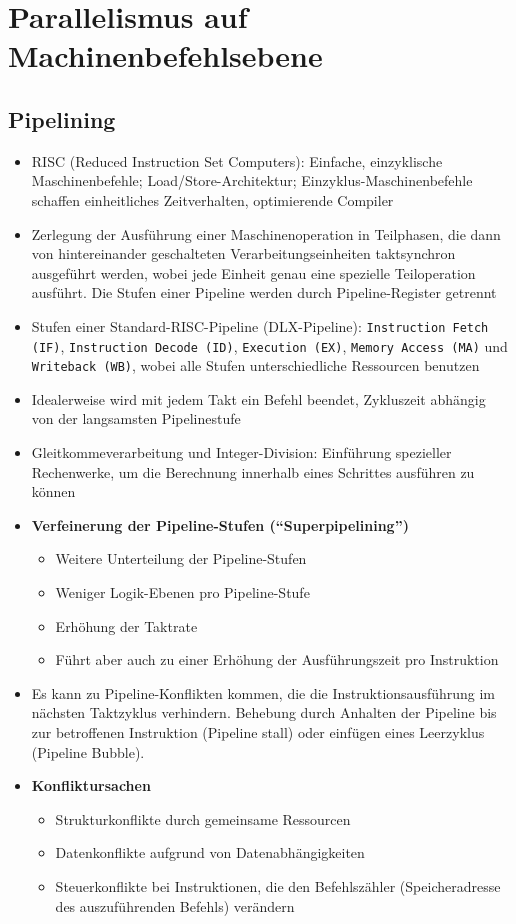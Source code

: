 \section{Parallelismus auf Machinenbefehlsebene}

\subsection{Pipelining}
\begin{itemize}
	\item RISC (Reduced Instruction Set Computers): Einfache, einzyklische Maschinenbefehle; Load/Store-Architektur; Einzyklus-Maschinenbefehle schaffen einheitliches Zeitverhalten, optimierende Compiler
	\item Zerlegung der Ausführung einer Maschinenoperation in Teilphasen, die dann von hintereinander geschalteten Verarbeitungseinheiten taktsynchron ausgeführt werden, wobei jede Einheit genau eine spezielle Teiloperation ausführt. Die Stufen einer Pipeline werden durch Pipeline-Register getrennt
	\item Stufen einer Standard-RISC-Pipeline (DLX-Pipeline): \texttt{Instruction Fetch (IF)}, \texttt{Instruction Decode (ID)}, \texttt{Execution (EX)}, \texttt{Memory Access (MA)} und \texttt{Writeback (WB)}, wobei alle Stufen unterschiedliche Ressourcen benutzen
	\item Idealerweise wird mit jedem Takt ein Befehl beendet, Zykluszeit abhängig von der langsamsten Pipelinestufe
	\item Gleitkommeverarbeitung und Integer-Division: Einführung spezieller Rechenwerke, um die Berechnung innerhalb eines Schrittes ausführen zu können
	\item \textbf{Verfeinerung der Pipeline-Stufen ("`Superpipelining"')}
	\begin{itemize}
		\item Weitere Unterteilung der Pipeline-Stufen
		\item Weniger Logik-Ebenen pro Pipeline-Stufe 
		\item Erhöhung der Taktrate
		\item Führt aber auch zu einer Erhöhung der Ausführungszeit pro Instruktion
	\end{itemize}
	\item Es kann zu Pipeline-Konflikten kommen, die die Instruktionsausführung im nächsten Taktzyklus verhindern. Behebung durch Anhalten der Pipeline bis zur betroffenen Instruktion (Pipeline stall) oder einfügen eines Leerzyklus (Pipeline Bubble). 
	\item \textbf{Konfliktursachen}
	\begin{itemize}
		\item Strukturkonflikte durch gemeinsame Ressourcen
		\item Datenkonflikte aufgrund von Datenabhängigkeiten
		\item Steuerkonflikte bei Instruktionen, die den Befehlszähler (Speicheradresse des auszuführenden Befehls) verändern
	\end{itemize}
\end{itemize}

